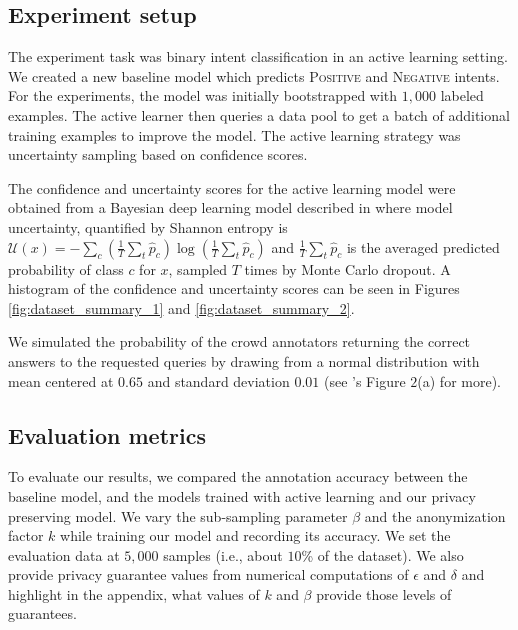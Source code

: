 \documentclass[letterpaper]{article}
\begin{document}
\subsection{Experiment setup}
The experiment task was binary intent classification in an active learning setting. We created a new baseline model which predicts \textsc{Positive} and \textsc{Negative} intents. For the experiments, the model was initially bootstrapped with $1,000$ labeled examples. The active learner then queries a data pool to get a batch of additional training examples to improve the model. The active learning strategy was uncertainty sampling based on confidence scores. 

The confidence and uncertainty scores for the active learning model were obtained from a Bayesian deep learning model described in \cite{yang2018leveraging} where model uncertainty, quantified by Shannon entropy is $\mathcal{U}(x) = -\sum_{c}(\frac{1}{T}\sum_{t} \hat{p}_{c}) \log (\frac{1}{T}\sum_{t} \hat{p}_{c})$ and $\frac{1}{T}\sum_{t} \hat{p}_{c}$ is the averaged predicted probability of class $c$ for $x$, sampled $T$ times by Monte Carlo dropout. A histogram of the confidence and uncertainty scores can be seen in Figures \ref{fig:dataset_summary_1} and \ref{fig:dataset_summary_2}. 

We simulated the probability of the crowd annotators returning the correct answers to the requested queries by drawing from a normal distribution with mean centered at $0.65$ and standard deviation $0.01$ (see \cite{yang2018leveraging}'s Figure $2$(a) for more). 




\subsection{Evaluation metrics}
To evaluate our results, we compared the annotation accuracy between the baseline model, and the models trained with active learning and our privacy preserving model. We vary the sub-sampling parameter $\beta$ and the anonymization factor $k$ while training our model and recording its accuracy. We set the evaluation data at $5,000$ samples (i.e., about $10$\% of the dataset). We also provide privacy guarantee values from numerical computations of $\epsilon$ and $\delta$ and highlight in the appendix, what values of $k$ and $\beta$ provide those levels of guarantees.
\end{document}
